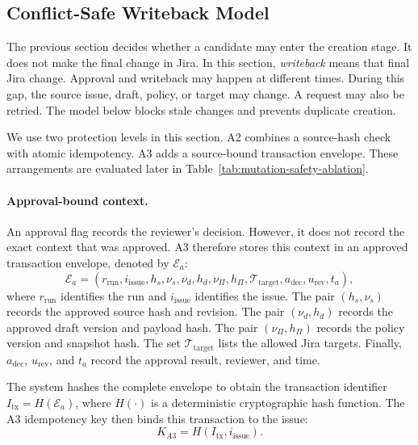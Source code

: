 \documentclass[manuscript,review]{acmart}
\begin{document}
\subsection{Conflict-Safe Writeback Model}

The previous section decides whether a candidate may enter the creation stage. It does not make the final change in Jira. In this section, \emph{writeback} means that final Jira change. Approval and writeback may happen at different times. During this gap, the source issue, draft, policy, or target may change. A request may also be retried. The model below blocks stale changes and prevents duplicate creation.

We use two protection levels in this section. A2 combines a source-hash check with atomic idempotency. A3 adds a source-bound transaction envelope. These arrangements are evaluated later in Table~\ref{tab:mutation-safety-ablation}.

\paragraph{Approval-bound context.}
An approval flag records the reviewer's decision. However, it does not record the exact context that was approved. A3 therefore stores this context in an approved transaction envelope, denoted by $\mathcal{E}_a$:
\begin{equation}
\mathcal{E}_a=(r_{\mathrm{run}},i_{\mathrm{issue}},h_s,\nu_s,\nu_d,h_d,\nu_{\Pi},h_{\Pi},\mathcal{T}_{\mathrm{target}},a_{\mathrm{dec}},u_{\mathrm{rev}},t_a),
\end{equation}
where $r_{\mathrm{run}}$ identifies the run and $i_{\mathrm{issue}}$ identifies the issue. The pair $(h_s,\nu_s)$ records the approved source hash and revision. The pair $(\nu_d,h_d)$ records the approved draft version and payload hash. The pair $(\nu_{\Pi},h_{\Pi})$ records the policy version and snapshot hash. The set $\mathcal{T}_{\mathrm{target}}$ lists the allowed Jira targets. Finally, $a_{\mathrm{dec}}$, $u_{\mathrm{rev}}$, and $t_a$ record the approval result, reviewer, and time.

The system hashes the complete envelope to obtain the transaction identifier $I_{\mathrm{tx}}=H(\mathcal{E}_a)$, where $H(\cdot)$ is a deterministic cryptographic hash function. The A3 idempotency key then binds this transaction to the issue:
\begin{equation}
K_{A3}=H(I_{\mathrm{tx}},i_{\mathrm{issue}}).
\end{equation}
\end{document}
